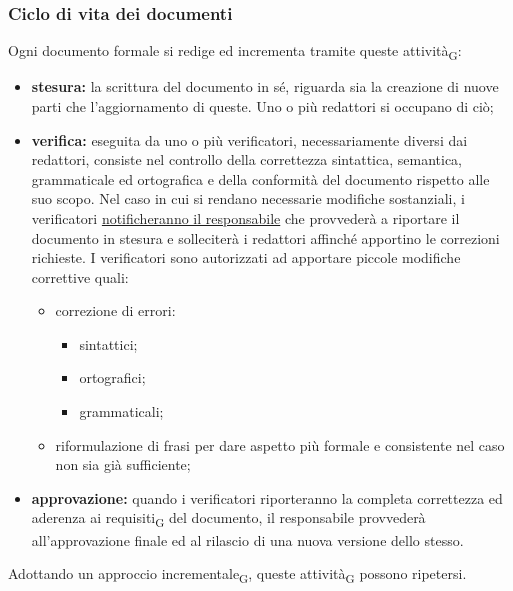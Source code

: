     \subsubsection{Ciclo di vita dei documenti}
    \label{ciclovitadoc}
    Ogni documento formale si redige ed incrementa tramite queste attività\textsubscript{G}:
    \begin{itemize}
        \item \textbf{stesura: }la scrittura del documento in sé, riguarda sia la creazione di nuove parti che l'aggiornamento di queste. Uno o più redattori si occupano di ciò;
        \item \textbf{verifica: }eseguita da uno o più verificatori, necessariamente diversi dai redattori, consiste nel controllo della correttezza sintattica, semantica, grammaticale ed ortografica e della conformità del documento rispetto alle suo scopo. Nel caso in cui si rendano necessarie modifiche sostanziali, i verificatori \hyperref[risoluzioneproblemi]{notificheranno il responsabile} che provvederà a riportare il documento in stesura e solleciterà i redattori affinché apportino le correzioni richieste. I verificatori sono autorizzati ad apportare piccole modifiche correttive quali:
        \begin{itemize}
            \item correzione di errori:
                \begin{itemize}
                    \item sintattici;
                    \item ortografici;
                    \item grammaticali;
                \end{itemize}

            \item riformulazione di frasi per dare aspetto più formale e consistente nel caso non sia già sufficiente;
        \end{itemize}
        \item \textbf{approvazione: }quando i verificatori riporteranno la completa correttezza ed aderenza ai requisiti\textsubscript{G} del documento, il responsabile provvederà all'approvazione finale ed al rilascio di una nuova versione dello stesso.
    \end{itemize}
    Adottando un approccio incrementale\textsubscript{G}, queste attività\textsubscript{G} possono ripetersi.
